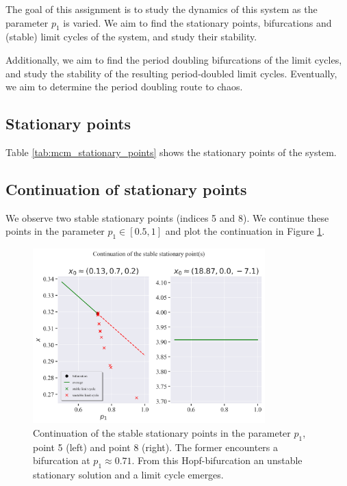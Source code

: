 The goal of this assignment is to study the dynamics of this system as the parameter $p_1$ is varied.
We aim to find the stationary points, bifurcations and (stable) limit cycles of the system, and study their stability.

Additionally, we aim to find the period doubling bifurcations of the limit cycles, and study the stability of the resulting
period-doubled limit cycles. Eventually, we aim to determine the period doubling route to chaos.

\subsection{Stationary points}
Table \ref{tab:mcm_stationary_points} shows the stationary points of the system. 


\subsection{Continuation of stationary points}
We observe two stable stationary points (indices 5 and 8). We continue these
points in the parameter $ p_1 \in [0.5, 1] $ and plot the continuation in Figure \ref{fig:mcm_continuation}.
\begin{figure}[H]
    \centering
    \includegraphics[width=0.8\textwidth]{figures/mcm_continuation.png}
    \caption{Continuation of the stable stationary points in the parameter $p_1$,
    point 5 (left) and point 8 (right). The former encounters a bifurcation at $p_1 \approx 0.71$. From this 
    Hopf-bifurcation an unstable stationary solution and a limit cycle emerges.}
    \label{fig:mcm_continuation}
\end{figure}

